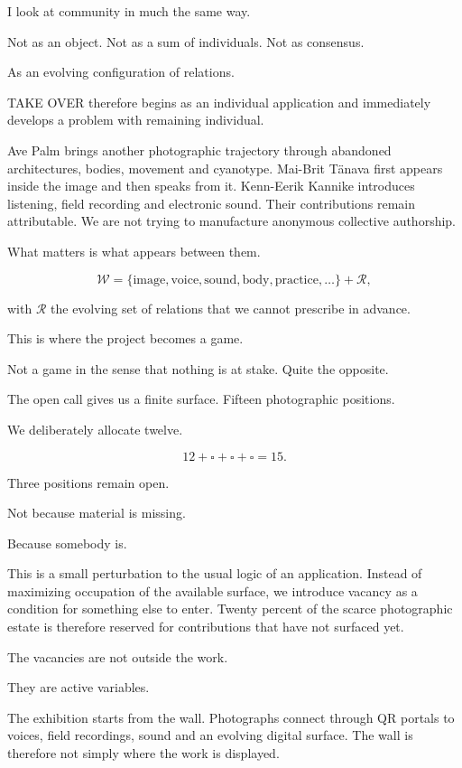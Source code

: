 I look at community in much the same way.

Not as an object. Not as a sum of individuals. Not as consensus.

As an evolving configuration of relations.

TAKE OVER therefore begins as an individual application and immediately
develops a problem with remaining individual.

Ave Palm brings another photographic trajectory through abandoned
architectures, bodies, movement and cyanotype. Mai-Brit Tänava first
appears inside the image and then speaks from it. Kenn-Eerik Kannike
introduces listening, field recording and electronic sound. Their
contributions remain attributable. We are not trying to manufacture
anonymous collective authorship.

What matters is what appears between them.

\[
\mathcal W =
\{\text{image},\text{voice},\text{sound},\text{body},\text{practice},\ldots\}
+\mathcal R ,
\]

with $\mathcal R$ the evolving set of relations that we cannot prescribe
in advance.

This is where the project becomes a game.

Not a game in the sense that nothing is at stake. Quite the opposite.

The open call gives us a finite surface. Fifteen photographic positions.

We deliberately allocate twelve.

\[
12+\square+\square+\square=15.
\]

Three positions remain open.

Not because material is missing.

Because somebody is.

This is a small perturbation to the usual logic of an application.
Instead of maximizing occupation of the available surface, we introduce
vacancy as a condition for something else to enter. Twenty percent of
the scarce photographic estate is therefore reserved for contributions
that have not surfaced yet.

The vacancies are not outside the work.

They are active variables.

The exhibition starts from the wall. Photographs connect through QR
portals to voices, field recordings, sound and an evolving digital
surface. The wall is therefore not simply where the work is displayed.

